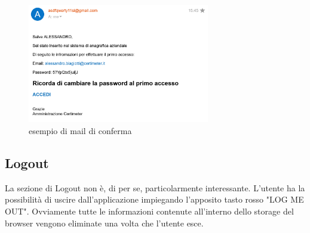\begin{itemize}
    \begin{figure}[h]
        \centering
        \includegraphics[width=300px]{./images/mail_conferma.png}
        \caption{esempio di mail di conferma}
        \label{fig:esempioMail}
    \end{figure}
\end{itemize}

\subsection{Logout}
La sezione di Logout non è, di per se, particolarmente interessante. L'utente ha la possibilità di uscire dall'applicazione impiegando l'apposito tasto rosso "LOG ME OUT". Ovviamente tutte le informazioni contenute all'interno dello storage del browser vengono eliminate una volta che l'utente esce.

